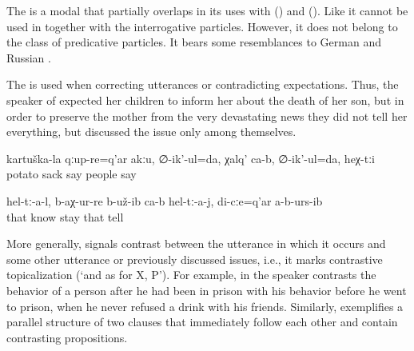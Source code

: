 The   is a modal  that partially overlaps in its uses with  () and  (). Like  it cannot be used in  together with the interrogative particles. However, it does not belong to the class of predicative particles. It bears some resemblances to German  and Russian .

The  is used when correcting utterances  or contradicting expectations. Thus, the speaker of  expected her children to inform her about the death of her son, but in order to preserve the mother from the very devastating news they did not tell her everything, but discussed the issue only among themselves.

\begin{exe}
	\ex	\label{ex:These are not potato sacks, I say, they are people minor}
	\gll	kartuška-la	qːup-re=q'ar	akːu,	∅-ik'-ul=da,	χalq'	ca-b,	∅-ik'-ul=da,	heχ-tːi\\
		potato	sack		say	people		say	\\
	\glt	{}

	\ex	\label{ex:Apparently they knew it and they did not tell it to me minor}
	\gll	hel-tː-a-l,	b-aχ-ur-re	b-už-ib	ca-b	hel-tː-a-j,	di-cːe=q'ar	a-b-urs-ib\\
		that	know	stay		that		tell\\
	\glt	{}
\end{exe}

More generally,  signals contrast between the utterance in which it occurs and some other utterance or previously discussed issues, i.e., it marks contrastive topicalization (`and as for X, P'). For example, in  the speaker contrasts the behavior of a person after he had been in prison with his behavior before he went to prison, when he never refused a drink with his friends. Similarly,  exemplifies a parallel structure of two clauses that immediately follow each other and contain contrasting propositions.

